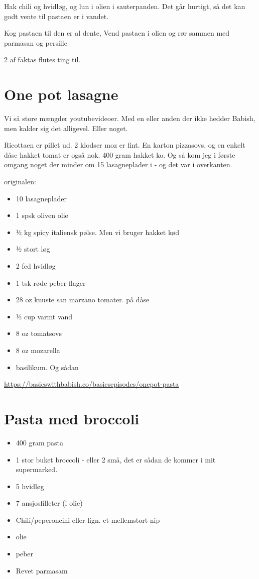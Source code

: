 \documentclass[
]{book}
\providecommand{\tightlist}{%
  \setlength{\itemsep}{0pt}\setlength{\parskip}{0pt}}
\begin{document}
Hak chili og hvidløg, og lun i olien i sauterpanden. Det går hurtigt, så det kan godt vente til pastaen er i vandet.

Kog pastaen til den er al dente,
Vend pastaen i olien og rør sammen med parmasan og persille

2 af faktas flutes ting til.

\hypertarget{one-pot-lasagne}{%
\section{One pot lasagne}\label{one-pot-lasagne}}

Vi så store mængder youtubevideoer. Med en eller anden der ikke hedder Babish, men kalder sig det alligevel. Eller noget.

Ricottaen er pillet ud. 2 klodser moz er fint. En karton pizzasovs, og en enkelt dåse hakket tomat er også nok.
400 gram hakket ko.
Og så kom jeg i første omgang noget der minder om 15 lasagneplader i - og det var i overkanten.

originalen:

\begin{itemize}
\tightlist
\item
  10 lasagneplader
\item
  1 spsk oliven olie
\item
  ½ kg spicy italiensk pølse. Men vi bruger hakket kød
\item
  ½ stort løg
\item
  2 fed hvidløg
\item
  1 tsk røde peber flager
\item
  28 oz knuste san marzano tomater. på dåse
\item
  ½ cup varmt vand
\item
  8 oz tomatsovs
\item
  8 oz mozarella
\item
  basilikum. Og sådan
\end{itemize}

\url{https://basicswithbabish.co/basicsepisodes/onepot-pasta}

\hypertarget{pasta-med-broccoli}{%
\section{Pasta med broccoli}\label{pasta-med-broccoli}}

\begin{itemize}
\tightlist
\item
  400 gram pasta
\item
  1 stor buket broccoli - eller 2 små, det er sådan de kommer i mit supermarked.
\item
  5 hvidløg
\item
  7 ansjosfilleter (i olie)
\item
  Chili/peperoncini eller lign. et mellemstort nip
\item
  olie
\item
  peber
\item
  Revet parmasam
\end{itemize}
\end{document}
